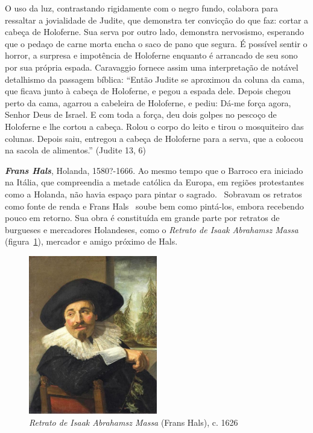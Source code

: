 O uso da luz, contrastando rigidamente com o negro fundo, colabora
para ressaltar a jovialidade de Judite, que demonstra ter convicção do
que faz: cortar a cabeça de Holoferne. Sua serva por outro lado,
demonstra nervosismo, esperando que o pedaço de carne morta encha o
saco de pano que segura. É possível sentir o horror, a surpresa e
impotência de Holoferne enquanto é arrancado de seu sono por sua
própria espada. Caravaggio fornece assim uma interpretação de notável
detalhismo da passagem bíblica: ``Então Judite se aproximou da coluna
da cama, que ficava junto à cabeça de Holoferne, e pegou a espada
dele. Depois chegou perto da cama, agarrou a cabeleira de Holoferne, e
pediu: Dá-me força agora, Senhor Deus de Israel. E com toda a força,
deu dois golpes no pescoço de Holoferne e lhe cortou a cabeça. Rolou o
corpo do leito e tirou o mosquiteiro das colunas. Depois saiu,
entregou a cabeça de Holoferne para a serva, que a colocou na sacola
de alimentos.'' (Judite 13, 6)

\textbf{\emph{Frans Hals}}, Holanda, 1580?-1666. Ao mesmo tempo que o
Barroco era iniciado na Itália, que compreendia a metade católica da
Europa, em regiões protestantes como a Holanda, não havia espaço para
pintar o sagrado.~\cite{gombrich} Sobravam os retratos como fonte de
renda e Frans Hals~\cite{grimm} soube bem como pintá-los, embora
recebendo pouco em retorno. Sua obra é constituída em grande parte por
retratos de burgueses e mercadores Holandeses, como o \textit{Retrato
de Isaak Abrahamsz Massa} (figura~\ref{fig:hals:massa}), mercador e
amigo próximo de Hals. 

\begin{figure}
  \vspace{-15pt}
  \begin{centering}
    \caption{\emph{Retrato de Isaak Abrahamsz Massa} (Frans Hals), c. 1626}
    \label{fig:hals:massa}
    \includegraphics[width=0.5\textwidth]{figs/hals_massa.png}
  \end{centering}
\end{figure}

